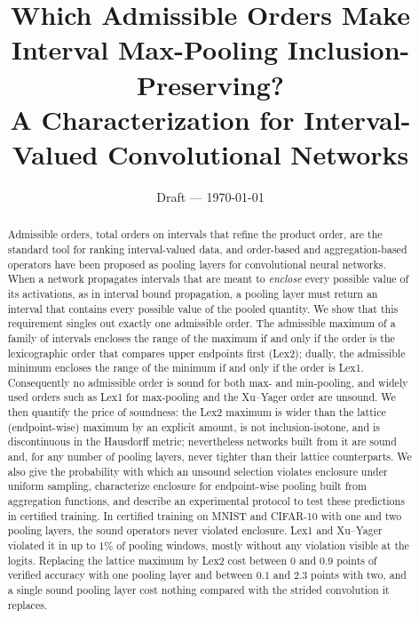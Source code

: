 
\usepackage{tikz}
\usetikzlibrary{arrows.meta,calc}

\title{Which Admissible Orders Make Interval Max-Pooling Inclusion-Preserving?\\[2pt]
\large A Characterization for Interval-Valued Convolutional Networks}
\author{}
\date{Draft --- \today}


\maketitle

\begin{abstract}
Admissible orders, total orders on intervals that refine the product order, are the standard tool for ranking interval-valued data, and order-based and aggregation-based operators have been proposed as pooling layers for convolutional neural networks. When a network propagates intervals that are meant to \emph{enclose} every possible value of its activations, as in interval bound propagation, a pooling layer must return an interval that contains every possible value of the pooled quantity. We show that this requirement singles out exactly one admissible order. The admissible maximum of a family of intervals encloses the range of the maximum if and only if the order is the lexicographic order that compares upper endpoints first (Lex2); dually, the admissible minimum encloses the range of the minimum if and only if the order is Lex1. Consequently no admissible order is sound for both max- and min-pooling, and widely used orders such as Lex1 for max-pooling and the Xu--Yager order are unsound. We then quantify the price of soundness: the Lex2 maximum is wider than the lattice (endpoint-wise) maximum by an explicit amount, is not inclusion-isotone, and is discontinuous in the Hausdorff metric; nevertheless networks built from it are sound and, for any number of pooling layers, never tighter than their lattice counterparts. We also give the probability with which an unsound selection violates enclosure under uniform sampling, characterize enclosure for endpoint-wise pooling built from aggregation functions, and describe an experimental protocol to test these predictions in certified training. In certified training on MNIST and CIFAR-10 with one and two pooling layers, the sound operators never violated enclosure. Lex1 and Xu--Yager violated it in up to $1\%$ of pooling windows, mostly without any violation visible at the logits. Replacing the lattice maximum by Lex2 cost between $0$ and $0.9$ points of verified accuracy with one pooling layer and between $0.1$ and $2.3$ points with two, and a single sound pooling layer cost nothing compared with the strided convolution it replaces.
\end{abstract}

